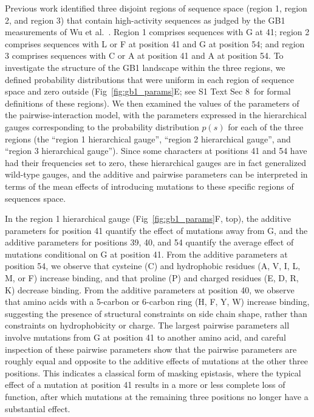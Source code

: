 \documentclass[10pt,letterpaper]{article}
\newcommand{\fig}[2]{Fig\ \ref{#1}#2}
\newcommand{\si}[1]{{S1 Text Sec #1}}
\begin{document}
Previous work \cite{Zhou:2020re,rozhonova2023protein} identified three disjoint regions of sequence space (region 1, region 2, and region 3) that contain high-activity sequences as judged by the GB1 measurements of Wu et al.\ \cite{Wu:2016kp}. Region 1 comprises sequences with G at 41; region 2 comprises sequences with L or F at position 41 and G at position 54; and region 3 comprises sequences with C or A at position 41 and A at position 54. To investigate the structure of the GB1 landscape within the three regions, we defined probability distributions that were uniform in each region of sequence space and zero outside (\fig{fig:gb1_params}E; see \si{8}\ for formal definitions of these regions). We then examined the values of the parameters of the pairwise-interaction model, with the parameters expressed in the hierarchical gauges corresponding to the probability distribution $p(s)$ for each of the three regions (the ``region 1 hierarchical gauge'', ``region 2 hierarchical gauge'', and ``region 3 hierarchical gauge''). Since some characters at positions 41 and 54 have had their frequencies set to zero, these hierarchical gauges are in fact generalized wild-type gauges, and the additive and pairwise parameters can be interpreted in terms of the mean effects of introducing mutations to these specific regions of sequences space.

In the region 1 hierarchical gauge (\fig{fig:gb1_params}F, top), the additive parameters for position 41 quantify the effect of mutations away from G, and the additive parameters for positions 39, 40, and 54 quantify the average effect of mutations conditional on G at position 41. From the additive parameters at position 54, we observe that cysteine (C) and hydrophobic residues (A, V, I, L, M, or F) increase binding, and that proline (P) and charged residues (E, D, R, K) decrease binding. From the additive parameters at position 40, we observe that amino acids with a 5-carbon or 6-carbon ring (H, F, Y, W) increase binding, suggesting the presence of structural constraints on side chain shape, rather than constraints on hydrophobicity or charge. The largest pairwise parameters all involve mutations from G at position 41 to another amino acid, and careful inspection of these pairwise parameters show that the pairwise parameters are roughly equal and opposite to the additive effects of mutations at the other three positions. This indicates a classical form of masking epistasis, where the typical effect of a mutation at position 41 results in a more or less complete loss of function, after which mutations at the remaining three positions no longer have a substantial effect.
\end{document}
